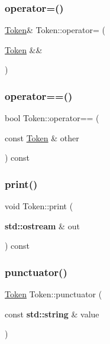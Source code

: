 \subsubsection{\texorpdfstring{operator=()}{operator=()}\hspace{0.1cm}{\footnotesize\ttfamily [2/2]}}
{\footnotesize\ttfamily \hyperlink{class_token}{Token}\& Token\+::operator= (\begin{DoxyParamCaption}\item[{\hyperlink{class_token}{Token} \&\&}]{ }\end{DoxyParamCaption})\hspace{0.3cm}{\ttfamily [default]}}

\mbox{\label{class_token_a20c14983ac6c11ffb89135e2cd91169f}} 
\subsubsection{\texorpdfstring{operator==()}{operator==()}}
{\footnotesize\ttfamily bool Token\+::operator== (\begin{DoxyParamCaption}\item[{const \hyperlink{class_token}{Token} \&}]{other }\end{DoxyParamCaption}) const}

\mbox{\label{class_token_a50f3ddd1f75c6ae38e0156dd16796a9e}} 
\subsubsection{\texorpdfstring{print()}{print()}}
{\footnotesize\ttfamily void Token\+::print (\begin{DoxyParamCaption}\item[{\textbf{ std\+::ostream} \&}]{out }\end{DoxyParamCaption}) const}

\mbox{\label{class_token_aef1c084308395ed9ad7328a6aa321e5a}} 
\subsubsection{\texorpdfstring{punctuator()}{punctuator()}}
{\footnotesize\ttfamily \hyperlink{class_token}{Token} Token\+::punctuator (\begin{DoxyParamCaption}\item[{const \textbf{ std\+::string} \&}]{value }\end{DoxyParamCaption})\hspace{0.3cm}{\ttfamily [static]}}

